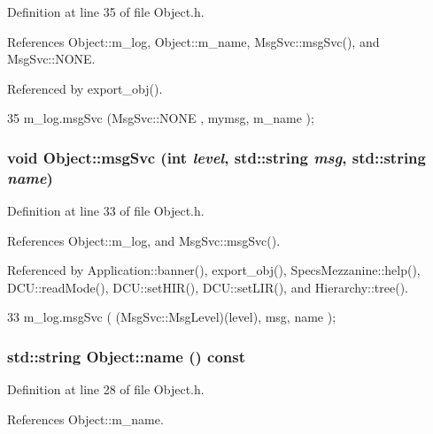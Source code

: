 Definition at line 35 of file Object.h.

References Object::m\_\-log, Object::m\_\-name, MsgSvc::msgSvc(), and MsgSvc::NONE.

Referenced by export\_\-obj().


\begin{DoxyCode}
35 { m_log.msgSvc (MsgSvc::NONE    , mymsg, m_name ); }
\end{DoxyCode}
\hypertarget{classObject_a3f9d5537ebce0c0f2bf6ae4d92426f3c}{
\subsubsection[{msgSvc}]{\setlength{\rightskip}{0pt plus 5cm}void Object::msgSvc (int {\em level}, \/  std::string {\em msg}, \/  std::string {\em name})}}
\label{classObject_a3f9d5537ebce0c0f2bf6ae4d92426f3c}


Definition at line 33 of file Object.h.

References Object::m\_\-log, and MsgSvc::msgSvc().

Referenced by Application::banner(), export\_\-obj(), SpecsMezzanine::help(), DCU::readMode(), DCU::setHIR(), DCU::setLIR(), and Hierarchy::tree().


\begin{DoxyCode}
33 { m_log.msgSvc ( (MsgSvc::MsgLevel)(level), msg, name ); }
\end{DoxyCode}
\hypertarget{classObject_a975e888d50bfcbffda2c86368332a5cd}{
\subsubsection[{name}]{\setlength{\rightskip}{0pt plus 5cm}std::string Object::name () const}}
\label{classObject_a975e888d50bfcbffda2c86368332a5cd}


Definition at line 28 of file Object.h.

References Object::m\_\-name.

